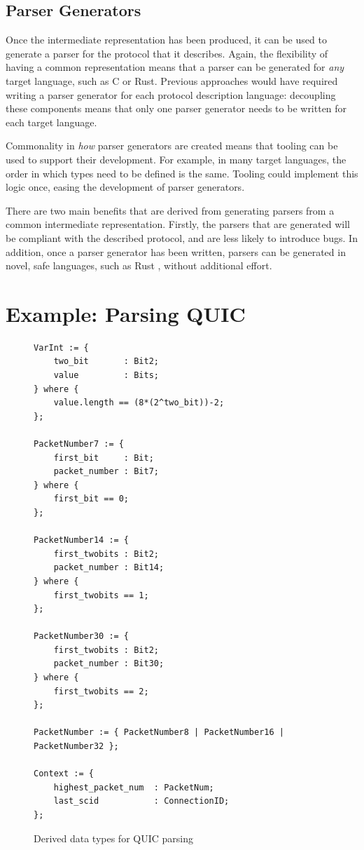 \documentclass[10pt,sigconf]{acmart}
\begin{document}
\subsection{Parser Generators}
\label{sec:npr-output}

Once the intermediate representation has been produced, it can be used to generate a
parser for the protocol that it describes. Again, the flexibility of having a common
representation means that a parser can be generated for \emph{any} target language, such
as C or Rust. Previous approaches would have required writing a parser generator for each
protocol description language: decoupling these components means that only one parser
generator needs to be written for each target language.

Commonality in \emph{how} parser generators are created means that tooling can be used to
support their development. For example, in many target languages, the order in which types
need to be defined is the same. Tooling could implement this logic once, easing the
development of parser generators.

There are two main benefits that are derived from generating parsers from a common
intermediate representation. Firstly, the parsers that are generated will be compliant
with the described protocol, and are less likely to introduce bugs. In addition, once a
parser generator has been written, parsers can be generated in novel, safe languages, such
as Rust \cite{chifflier2017writing}, without additional effort.

\section{Example: Parsing QUIC}
\label{sec:casestudy}

\begin{figure}
	\vspace{3mm}
    \begin{BVerbatim}[fontsize=\scriptsize]
VarInt := {
	two_bit       : Bit2;
	value         : Bits;
} where {
	value.length == (8*(2^two_bit))-2;
};

PacketNumber7 := {
	first_bit     : Bit;
	packet_number : Bit7;
} where {
	first_bit == 0;
};

PacketNumber14 := {
	first_twobits : Bit2;
	packet_number : Bit14;
} where {
	first_twobits == 1;
};

PacketNumber30 := {
	first_twobits : Bit2;
	packet_number : Bit30;
} where {
	first_twobits == 2;
};

PacketNumber := { PacketNumber8 | PacketNumber16 | PacketNumber32 };
                     
Context := {
	highest_packet_num  : PacketNum;
	last_scid           : ConnectionID;
};
    \end{BVerbatim}
    \caption{Derived data types for QUIC parsing}
    \label{fig:quic-base}
\end{figure}
\end{document}
